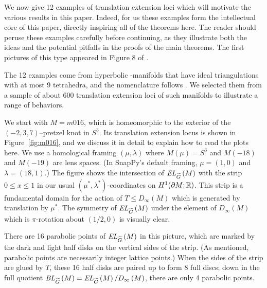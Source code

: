 \documentclass[tikz, sepfignums, defaultenums]{nmd/article}
\newcommand{\TEL}[1]{\mathit{EL}_\Gtil\left(#1\right)}
\newcommand{\SymTEL}[1]{D_\infty\left(#1\right)}
\newcommand{\TELquo}[1]{\mathit{BL}_\Gtil\left(#1\right)}
\begin{document}



We now give 12 examples of translation extension loci which will motivate
the various results in this paper.  Indeed, for us these examples form
the intellectual core of this paper, directly inspiring all of the
theorems here.  The reader should peruse these examples carefully
before continuing, as they illustrate both the ideas and the potential
pitfalls in the proofs of the main theorems.  The first pictures of
this type appeared in Figure 8 of \cite{Khoi2003}.

The 12 examples come from hyperbolic \3-manifolds that have ideal
triangulations with at most 9 tetrahedra, and the nomenclature follows
\cite{CallahanHildebrandWeeks1999, Burton2014, SnapPy}.  We selected
them from a sample of about 600 translation extension loci of
such manifolds to illustrate a range of behaviors.

We start with $M = m016$, which is homeomorphic to the exterior of the
$(-2, 3, 7)$--pretzel knot in $S^3$.  Its translation extension locus
is shown in Figure~\ref{fig:m016}, and we discuss it in detail to explain
how to read the plots here.  We use a homological framing
$(\mu, \lambda)$ where $M(\mu) = S^3$ and $M(-18)$ and $M(-19)$
are lens spaces.  (In SnapPy's default framing, $\mu = (1, 0)$ and
$\lambda = (18, 1)$.)  The figure shows the intersection of $\TEL{M}$
with the strip $0 \leq x \leq 1$ in our usual
$(\mu^*, \lambda^*)$-coordinates on $H^1(\partial M; {\mathbb R})$.  This strip
is a fundamental domain for the action of $T \leq \SymTEL{M}$ which is
generated by translation by $\mu^*$.  The symmetry of $\TEL{M}$ under
the element of $\SymTEL{M}$ which is $\pi$-rotation about $(1/2, 0)$
is visually clear.


There are 16 parabolic points of $\TEL{M}$ in this picture, which are
marked by the dark and light half disks on the vertical sides of the
strip.  (As mentioned, parabolic points are necessarily integer
lattice points.)  When the sides of the strip are glued by $T$, these
16 half disks are paired up to form 8 full discs; down in the full quotient
$\TELquo{M} = \TEL{M}/\SymTEL{M}$, there are only 4 parabolic points.
\end{document}
